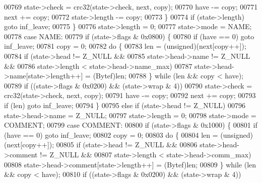 \begin{DoxyCode}
{{{{00769                         state->check = crc32(state->check, next, copy);
00770                     have -= copy;
00771                     next += copy;
00772                     state->length -= copy;
00773                 \}
00774                 \textcolor{keywordflow}{if} (state->length) \textcolor{keywordflow}{goto} inf\_leave;
00775             \}
00776             state->length = 0;
00777             state->mode = NAME;
00778         \textcolor{keywordflow}{case} NAME:
00779             \textcolor{keywordflow}{if} (state->flags & 0x0800) \{
00780                 \textcolor{keywordflow}{if} (have == 0) \textcolor{keywordflow}{goto} inf\_leave;
00781                 copy = 0;
00782                 \textcolor{keywordflow}{do} \{
00783                     len = (unsigned)(next[copy++]);
00784                     \textcolor{keywordflow}{if} (state->head != Z\_NULL &&
00785                             state->head->name != Z\_NULL &&
00786                             state->length < state->head->name\_max)
00787                         state->head->name[state->length++] = (Bytef)len;
00788                 \} \textcolor{keywordflow}{while} (len && copy < have);
00789                 \textcolor{keywordflow}{if} ((state->flags & 0x0200) && (state->wrap & 4))
00790                     state->check = crc32(state->check, next, copy);
00791                 have -= copy;
00792                 next += copy;
00793                 \textcolor{keywordflow}{if} (len) \textcolor{keywordflow}{goto} inf\_leave;
00794             \}
00795             \textcolor{keywordflow}{else} \textcolor{keywordflow}{if} (state->head != Z\_NULL)
00796                 state->head->name = Z\_NULL;
00797             state->length = 0;
00798             state->mode = COMMENT;
00799         \textcolor{keywordflow}{case} COMMENT:
00800             \textcolor{keywordflow}{if} (state->flags & 0x1000) \{
00801                 \textcolor{keywordflow}{if} (have == 0) \textcolor{keywordflow}{goto} inf\_leave;
00802                 copy = 0;
00803                 \textcolor{keywordflow}{do} \{
00804                     len = (unsigned)(next[copy++]);
00805                     \textcolor{keywordflow}{if} (state->head != Z\_NULL &&
00806                             state->head->comment != Z\_NULL &&
00807                             state->length < state->head->comm\_max)
00808                         state->head->comment[state->length++] = (Bytef)len;
00809                 \} \textcolor{keywordflow}{while} (len && copy < have);
00810                 \textcolor{keywordflow}{if} ((state->flags & 0x0200) && (state->wrap & 4))
}}}}
\end{DoxyCode}
